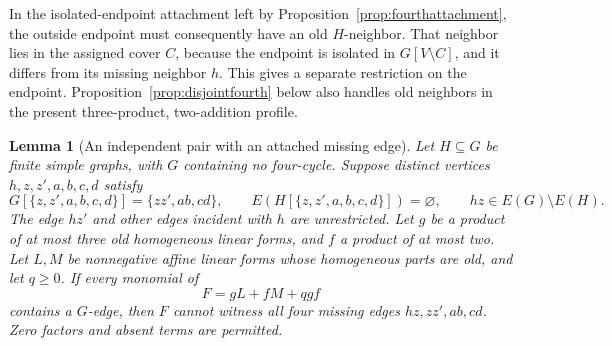 \documentclass[11pt]{article}
\newtheorem{lemma}[theorem]{Lemma}
\theoremstyle{definition}
\theoremstyle{remark}
\begin{document}
In the isolated-endpoint attachment left by Proposition~\ref{prop:fourthattachment}, the outside endpoint must consequently have an old $H$-neighbor. That neighbor lies in the assigned cover $C$, because the endpoint is isolated in $G[V\setminus C]$, and it differs from its missing neighbor $h$. This gives a separate restriction on the endpoint. Proposition~\ref{prop:disjointfourth} below also handles old neighbors in the present three-product, two-addition profile.

\begin{lemma}[An independent pair with an attached missing edge]\label{lem:attachedpair}
Let $H\subseteq G$ be finite simple graphs, with $G$ containing no four-cycle. Suppose distinct vertices $h,z,z',a,b,c,d$ satisfy
\[
 G[\{z,z',a,b,c,d\}]=\{zz',ab,cd\},\qquad
 E(H[\{z,z',a,b,c,d\}])=\varnothing,
 \qquad hz\in E(G)\setminus E(H).
\]
The edge $hz'$ and other edges incident with $h$ are unrestricted. Let $g$ be a product of at most three old homogeneous linear forms, and $f$ a product of at most two. Let $L,M$ be nonnegative affine linear forms whose homogeneous parts are old, and let $q\geq0$. If every monomial of
\[
 F=gL+fM+qgf
\]
contains a $G$-edge, then $F$ cannot witness all four missing edges $hz,zz',ab,cd$. Zero factors and absent terms are permitted.
\end{lemma}
\end{document}
